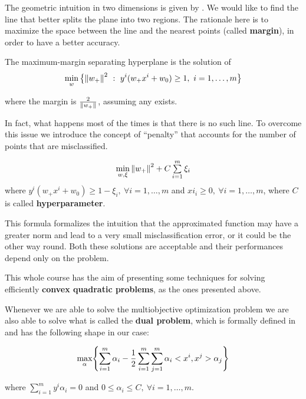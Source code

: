 \documentclass[computationalMathematics.tex]{subfiles}
\begin{document}
The geometric intuition in two dimensions is given by .
We would like to find the line that better splits the plane into two regions.
The rationale here is to maximize the space between the line and the nearest points (called \textbf{margin}), in order to have a better accuracy.


The maximum-margin separating hyperplane is the solution of
\[
  {\min\limits_w \big\{{\left\lVert w_+\right\rVert}^2~:~y^i( w_+ x^i + w_0 ) \geq 1, ~ i = 1, \ldots, m \big\}}
\]
       
where the margin is $\frac{2}{\left\lVert w_+\right\rVert}$, assuming any exists.

In fact, what happens most of the times is that there is no such line. 
To overcome this issue we introduce the concept of ``penalty'' that accounts for the number of points that are misclassified.

\begin{definition}
\[
  \textstyle \min\limits_{w,\xi} {{\left\lVert w_+\right\rVert}^2 + C \sum\limits_{i=1}^m \xi_i}
\]
where $y^i( w_+ x^i + w_0 ) \geq 1 - \xi_i, ~ \forall i = 1, \ldots, m$ and $xi_i \geq 0, ~ \forall i = 1, \ldots, m$, where $C$ is called \textbf{hyperparameter}.

This formula formalizes the intuition that the approximated function may have a greater norm and lead to a very small misclassification error, or it could be the other way round.
  Both these solutions are acceptable and their performances depend only on the problem.
\end{definition}

This whole course has the aim of presenting some techniques for solving efficiently \textbf{convex quadratic problems}, as the ones presented above.

Whenever we are able to solve the multiobjective optimization problem we are also able to solve what is called the \textbf{dual problem}, which is formally defined in  and has the following shape in our case:

\[
  \max\limits_{\alpha} \Biggl \{ \sum\limits_{i=1}^m \alpha_i - \frac{1}{2} \sum\limits_{i=1}^m \sum_{j=1}^m \alpha_i <x^i, x^j> \alpha_j \Biggr \}
\]

where $\sum\limits_{i=1}^m y^i \alpha_i = 0$ and $0 \leq \alpha_i \leq C, ~ \forall i = 1, \ldots, m$.
\end{document}
